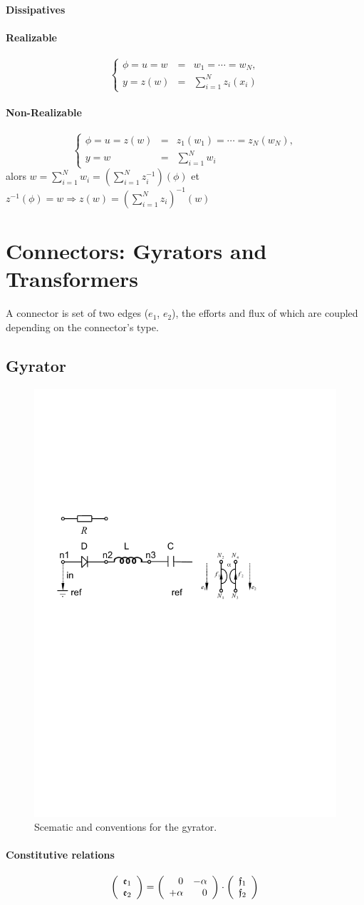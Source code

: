 \documentclass[10pt,a4paper]{article}
\begin{document}
{\textbf{Dissipatives}
\paragraph{Realizable} 
$$\left\{ \begin{array}{rcl}
\phi = u =w &=& w_1 =\cdots = w_N ,\\
y =z(w)&= &\sum_{i=1}^N z_i(x_i) 
\end{array}\right.$$
\paragraph{Non-Realizable}
$$\left\{ \begin{array}{rcl}
\phi = u =z(w) &=& z_1(w_1) =\cdots = z_N(w_N) ,\\
y = w &=& \sum_{i=1}^Nw_i\end{array}\right.$$
alors $ w =\sum_{i=1}^N w_i=\left(\sum_{i=1}^N z^{-1}_i\right)(\phi) $ et $z^{-1}(\phi) = w\Rightarrow z(w) =  \left(\sum_{i=1}^N z_i\right)^{-1}(w)$


\section{Connectors: Gyrators and Transformers}
A connector is set of two edges ($e_1$, $e_2$), the efforts and flux of which are coupled depending on the connector's type.
\subsection{Gyrator}
%
\begin{figure}
\centering
\includegraphics[width=0.3\linewidth]{figures/gyrator_scematic.pdf} 
\caption{Scematic and conventions for the gyrator.}
\end{figure}
%
\paragraph{Constitutive relations}
$$
\left(
\begin{array}{c}
\mathfrak{e}_1\\
\mathfrak{e}_2
\end{array}
\right)
=
\left(
\begin{array}{rr}
0 & -\alpha \\
+ \alpha  & 0
\end{array}
\right)
\cdot
\left(
\begin{array}{c}
\mathfrak{f}_1\\
\mathfrak{f}_2
\end{array}
\right)
$$
}
\end{document}
